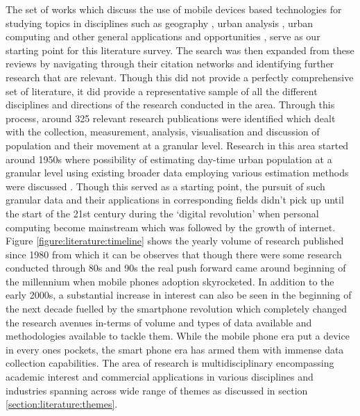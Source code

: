 The set of works which discuss the use of mobile devices based technologies for studying topics in disciplines such as geography \citet{li2016}, urban analysis \citep{ratti2006}, urban computing \citep{jiang2013} and other general applications and opportunities \citep{steenbruggen2013, arribas-bel2014}, serve as our starting point for this literature survey.
The search was then expanded from these reviews by navigating through their citation networks and identifying further research that are relevant.
Though this did not provide a perfectly comprehensive set of literature, it did provide a representative sample of all the different disciplines and directions of the research conducted in the area.
Through this process, around 325 relevant research publications were identified which dealt with the collection, measurement, analysis, visualisation and discussion of population and their movement at a granular level.
Research in this area started around 1950s where possibility of estimating day-time urban population at a granular level using existing  broader data employing various estimation methods were discussed \cite{foley1954, schmitt1956}.
Though this served as a starting point, the pursuit of such granular data and their applications in corresponding fields didn't pick up until the start of the 21st century during the `digital revolution' when personal computing become mainstream which was followed by the growth of internet.
Figure \ref{figure:literature:timeline} shows the yearly volume of research published since 1980 from which it can be observes that though there were some research conducted through 80s and 90s the real push forward came around beginning of the millennium when mobile phones adoption skyrocketed.
In addition to the early 2000s, a substantial increase in interest can also be seen in the beginning of the next decade fuelled by the smartphone revolution which completely changed the research avenues in-terms of volume and types of data available and methodologies available to tackle them.
While the mobile phone era put a device in every ones pockets, the smart phone era has armed them with immense data collection capabilities.
The area of research is multidisciplinary encompassing academic interest and commercial applications in various disciplines and industries spanning across wide range of themes as discussed in section \ref{section:literature:themes}.


 



\pagebreak


